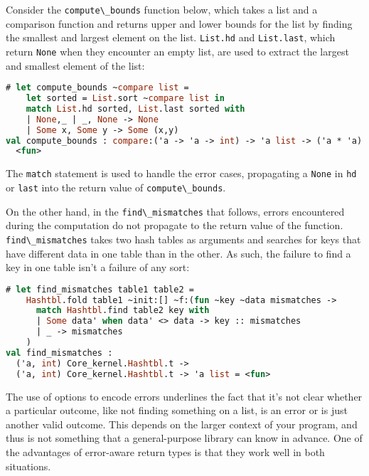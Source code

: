 Consider the \passthrough{\lstinline!compute\_bounds!} function below,
which takes a list and a comparison function and returns upper and lower
bounds for the list by finding the smallest and largest element on the
list. \passthrough{\lstinline!List.hd!} and
\passthrough{\lstinline!List.last!}, which return
\passthrough{\lstinline!None!} when they encounter an empty list, are
used to extract the largest and smallest element of the list:

\begin{lstlisting}[language=Caml]
# let compute_bounds ~compare list =
    let sorted = List.sort ~compare list in
    match List.hd sorted, List.last sorted with
    | None,_ | _, None -> None
    | Some x, Some y -> Some (x,y)
val compute_bounds : compare:('a -> 'a -> int) -> 'a list -> ('a * 'a) option =
  <fun>
\end{lstlisting}

The \passthrough{\lstinline!match!} statement is used to handle the
error cases, propagating a \passthrough{\lstinline!None!} in
\passthrough{\lstinline!hd!} or \passthrough{\lstinline!last!} into the
return value of \passthrough{\lstinline!compute\_bounds!}.

On the other hand, in the \passthrough{\lstinline!find\_mismatches!}
that follows, errors encountered during the computation do not propagate
to the return value of the function.
\passthrough{\lstinline!find\_mismatches!} takes two hash tables as
arguments and searches for keys that have different data in one table
than in the other. As such, the failure to find a key in one table isn't
a failure of any sort:

\begin{lstlisting}[language=Caml]
# let find_mismatches table1 table2 =
    Hashtbl.fold table1 ~init:[] ~f:(fun ~key ~data mismatches ->
      match Hashtbl.find table2 key with
      | Some data' when data' <> data -> key :: mismatches
      | _ -> mismatches
    )
val find_mismatches :
  ('a, int) Core_kernel.Hashtbl.t ->
  ('a, int) Core_kernel.Hashtbl.t -> 'a list = <fun>
\end{lstlisting}

The use of options to encode errors underlines the fact that it's not
clear whether a particular outcome, like not finding something on a
list, is an error or is just another valid outcome. This depends on the
larger context of your program, and thus is not something that a
general-purpose library can know in advance. One of the advantages of
error-aware return types is that they work well in both situations.

